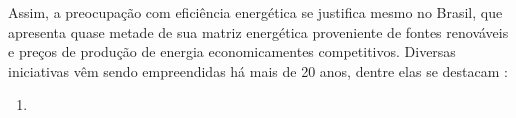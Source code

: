 Assim, a preocupação com eficiência energética se justifica mesmo no Brasil, 
que apresenta quase metade de sua matriz energética proveniente de fontes 
renováveis e preços de produção de energia economicamentes competitivos.
Diversas iniciativas vêm sendo empreendidas há mais de 20 anos, dentre elas se
destacam \cite{projecao_demanda_2012,slides_eff_energetica}:

\begin{enumerate}
\item 
\end{enumerate}




%
%
%
%
%

